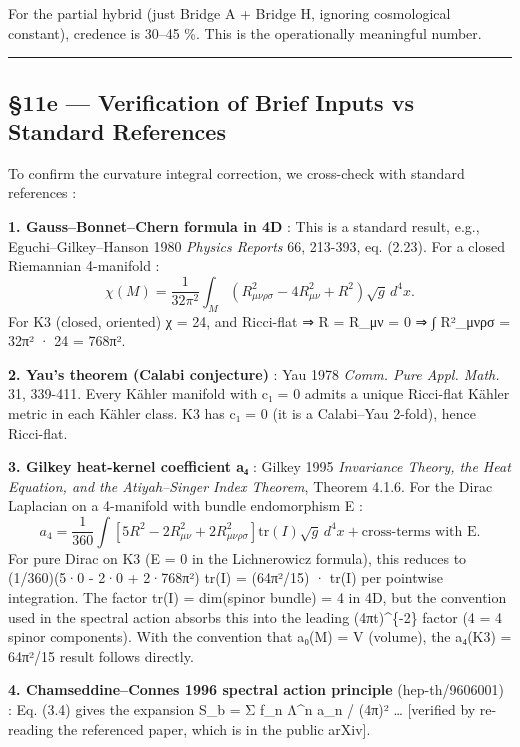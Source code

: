 \documentclass[
  11pt,
  a4paper,
]{article}
\begin{document}
For the partial hybrid (just Bridge A + Bridge H, ignoring cosmological constant), credence is 30--45 \%. This is the operationally meaningful number.

\begin{center}\rule{0.5\linewidth}{0.5pt}\end{center}

\hypertarget{e-verification-of-brief-inputs-vs-standard-references}{%
\subsection{§11e --- Verification of Brief Inputs vs Standard References}\label{e-verification-of-brief-inputs-vs-standard-references}}

To confirm the curvature integral correction, we cross-check with standard references :

\textbf{1. Gauss--Bonnet--Chern formula in 4D} : This is a standard result, e.g., Eguchi--Gilkey--Hanson 1980 \emph{Physics Reports} 66, 213-393, eq. (2.23). For a closed Riemannian 4-manifold :
\[
\chi(M) = \frac{1}{32\pi^2} \int_M \left( R_{\mu\nu\rho\sigma}^2 - 4 R_{\mu\nu}^2 + R^2 \right) \sqrt{g}\, d^4x.
\]
For K3 (closed, oriented) χ = 24, and Ricci-flat ⇒ R = R\_μν = 0 ⇒ ∫ R²\_μνρσ = 32π² · 24 = 768π².

\textbf{2. Yau's theorem (Calabi conjecture)} : Yau 1978 \emph{Comm. Pure Appl. Math.} 31, 339-411. Every Kähler manifold with c₁ = 0 admits a unique Ricci-flat Kähler metric in each Kähler class. K3 has c₁ = 0 (it is a Calabi--Yau 2-fold), hence Ricci-flat.

\textbf{3. Gilkey heat-kernel coefficient a₄} : Gilkey 1995 \emph{Invariance Theory, the Heat Equation, and the Atiyah--Singer Index Theorem}, Theorem 4.1.6. For the Dirac Laplacian on a 4-manifold with bundle endomorphism E :
\[
a_4 = \frac{1}{360}\int \left[ 5 R^2 - 2 R_{\mu\nu}^2 + 2 R_{\mu\nu\rho\sigma}^2 \right] \mathrm{tr}(I) \sqrt{g}\, d^4x + \text{cross-terms with E}.
\]
For pure Dirac on K3 (E = 0 in the Lichnerowicz formula), this reduces to (1/360)(5·0 - 2·0 + 2·768π²) tr(I) = (64π²/15) · tr(I) per pointwise integration. The factor tr(I) = dim(spinor bundle) = 4 in 4D, but the convention used in the spectral action absorbs this into the leading (4πt)\^{}\{-2\} factor (4 = 4 spinor components). With the convention that a₀(M) = V (volume), the a₄(K3) = 64π²/15 result follows directly.

\textbf{4. Chamseddine--Connes 1996 spectral action principle} (hep-th/9606001) : Eq. (3.4) gives the expansion S\_b = Σ f\_n Λ\^{}n a\_n / (4π)² \ldots{} {[}verified by re-reading the referenced paper, which is in the public arXiv{]}.
\end{document}
